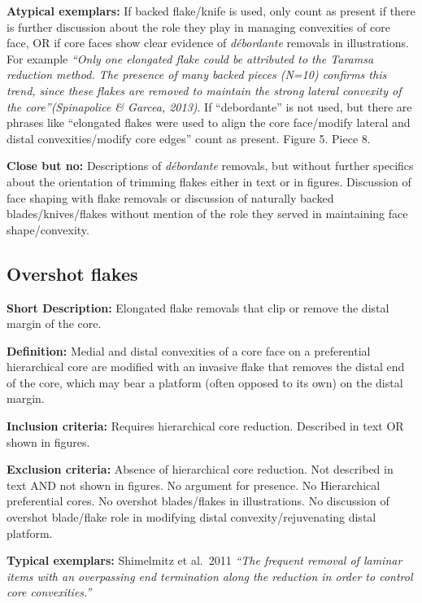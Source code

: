 \documentclass[
]{article}
\begin{document}
\textbf{Atypical exemplars:} If backed flake/knife is used, only count
as present if there is further discussion about the role they play in
managing convexities of core face, OR if core faces show clear evidence
of \emph{débordante} removals in illustrations. For example \emph{``Only
one elongated flake could be attributed to the Taramsa reduction method.
The presence of many backed pieces (N=10) confirms this trend, since
these flakes are removed to maintain the strong lateral convexity of the
core''(Spinapolice \& Garcea, 2013)}. If ``debordante'' is not used, but
there are phrases like ``elongated flakes were used to align the core
face/modify lateral and distal convexities/modify core edges'' count as
present. Figure 5. Piece 8.

\textbf{Close but no:} Descriptions of \emph{débordante} removals, but
without further specifics about the orientation of trimming flakes
either in text or in figures. Discussion of face shaping with flake
removals or discussion of naturally backed blades/knives/flakes without
mention of the role they served in maintaining face shape/convexity.

\hypertarget{overshot-flakes}{%
\subsection{Overshot flakes}\label{overshot-flakes}}

\textbf{Short Description:} Elongated flake removals that clip or remove
the distal margin of the core.

\textbf{Definition:} Medial and distal convexities of a core face on a
preferential hierarchical core are modified with an invasive flake that
removes the distal end of the core, which may bear a platform (often
opposed to its own) on the distal margin.

\textbf{Inclusion criteria:} Requires hierarchical core reduction.
Described in text OR shown in figures.

\textbf{Exclusion criteria:} Absence of hierarchical core reduction. Not
described in text AND not shown in figures. No argument for presence. No
Hierarchical preferential cores. No overshot blades/flakes in
illustrations. No discussion of overshot blade/flake role in modifying
distal convexity/rejuvenating distal platform.

\textbf{Typical exemplars:} Shimelmitz et al.~2011 \emph{``The frequent
removal of laminar items with an overpassing end termination along the
reduction in order to control core convexities.''}
\end{document}
